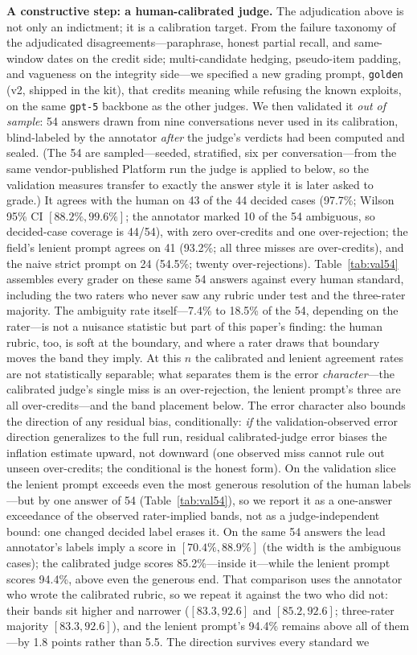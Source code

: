 \documentclass[11pt]{article}
\begin{document}
\textbf{A constructive step: a human-calibrated judge.} The adjudication above is not only an indictment; it is a calibration target. From the failure taxonomy of the adjudicated disagreements---paraphrase, honest partial recall, and same-window dates on the credit side; multi-candidate hedging, pseudo-item padding, and vagueness on the integrity side---we specified a new grading prompt, \texttt{golden} (v2, shipped in the kit), that credits meaning while refusing the known exploits, on the same \texttt{gpt-5} backbone as the other judges. We then validated it \emph{out of sample}: 54 answers drawn from nine conversations never used in its calibration, blind-labeled by the annotator \emph{after} the judge's verdicts had been computed and sealed. (The 54 are sampled---seeded, stratified, six per conversation---from the same vendor-published Platform run the judge is applied to below, so the validation measures transfer to exactly the answer style it is later asked to grade.) It agrees with the human on 43 of the 44 decided cases (97.7\%; Wilson 95\% CI $[88.2\%, 99.6\%]$; the annotator marked 10 of the 54 ambiguous, so decided-case coverage is 44/54), with zero over-credits and one over-rejection; the field's lenient prompt agrees on 41 (93.2\%; all three misses are over-credits), and the naive strict prompt on 24 (54.5\%; twenty over-rejections). Table~\ref{tab:val54} assembles every grader on these same 54 answers against every human standard, including the two raters who never saw any rubric under test and the three-rater majority. The ambiguity rate itself---7.4\% to 18.5\% of the 54, depending on the rater---is not a nuisance statistic but part of this paper's finding: the human rubric, too, is soft at the boundary, and where a rater draws that boundary moves the band they imply. At this $n$ the calibrated and lenient agreement rates are not statistically separable; what separates them is the error \emph{character}---the calibrated judge's single miss is an over-rejection, the lenient prompt's three are all over-credits---and the band placement below. The error character also bounds the direction of any residual bias, conditionally: \emph{if} the validation-observed error direction generalizes to the full run, residual calibrated-judge error biases the inflation estimate upward, not downward (one observed miss cannot rule out unseen over-credits; the conditional is the honest form). On the validation slice the lenient prompt exceeds even the most generous resolution of the human labels---but by one answer of 54 (Table~\ref{tab:val54}), so we report it as a one-answer exceedance of the observed rater-implied bands, not as a judge-independent bound: one changed decided label erases it. On the same 54 answers the lead annotator's labels imply a score in $[70.4\%, 88.9\%]$ (the width is the ambiguous cases); the calibrated judge scores 85.2\%---inside it---while the lenient prompt scores 94.4\%, above even the generous end. That comparison uses the annotator who wrote the calibrated rubric, so we repeat it against the two who did not: their bands sit higher and narrower ($[83.3, 92.6]$ and $[85.2, 92.6]$; three-rater majority $[83.3, 92.6]$), and the lenient prompt's 94.4\% remains above all of them---by 1.8 points rather than 5.5. The direction survives every standard we 
\end{document}
